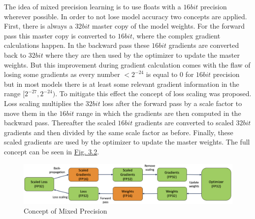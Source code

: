 The idea of mixed precision learning is to use floats with a $16bit$ precision wherever possible. In order to not lose model accuracy two concepts are applied. First, there is always a $32bit$ master copy of the model weights. For the forward pass this master copy is converted to $16bit$, where the complex gradient calculations happen. In the backward pass these $16bit$ gradients are converted back to $32bit$ where they are then used by the optimizer to update the master weights. But this improvement during gradient calculation comes with the flaw of losing some gradients as every number $<2^{-24}$ is equal to $0$ for $16bit$ precision but in most models there is at least some relevant gradient information in the range $[2^{-27},2^{-24})$. To mitigate this effect the concept of loss scaling was proposed. Loss scaling multiplies the $32bit$ loss after the forward pass by a scale factor to move them in the $16bit$ range in which the gradients are then computed in the backward pass. Thereafter the scaled $16bit$ gradients are converted to scaled $32bit$ gradients and then divided by the same scale factor as before. Finally, these scaled gradients are used by the optimizer to update the master weights. The full concept can be seen in \hyperref[fig:3.2]{Fig. 3.2}.
%
\begin{figure}[] \label{fig:3.2}
    \centering
    \includegraphics[width=.9\textwidth]{Chapters/figures/mixed_prec.PNG}
    \caption{Concept of Mixed Precision}
\end{figure}
%

